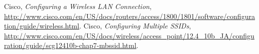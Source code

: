 \begin{thebibliography}{9}
  Cisco,
  \emph{Configuring a Wireless LAN Connection},
  \url{http://www.cisco.com/en/US/docs/routers/access/1800/1801/software/configuration/guide/wireless.html}.
  Cisco,
  \emph{Configuring Multiple SSIDs},
  \url{http://www.cisco.com/en/US/docs/wireless/access_point/12.4_10b_JA/configuration/guide/scg12410b-chap7-mbssid.html}.

\end{thebibliography}


